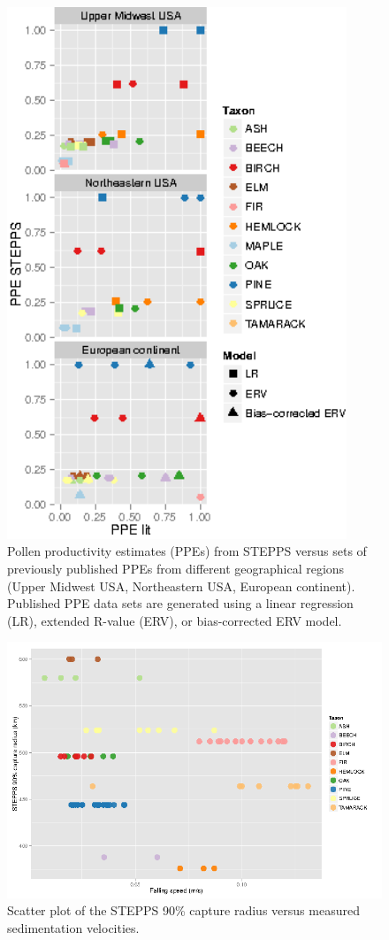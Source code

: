 \begin{figure}
\centering
\includegraphics[width=4in]{figures/PPEs_panels.png}
\caption{Pollen productivity estimates (PPEs) from STEPPS versus sets
  of previously published PPEs from different geographical regions
  (Upper Midwest USA, Northeastern USA, European continent). Published
  PPE data sets are generated using a linear regression (LR), extended
  R-value (ERV), or bias-corrected ERV model.}
\label{fig:ppe}
\end{figure}

\begin{figure}
\centering
\includegraphics[width=7in]{figures/SVs_90_single.png}
\caption{Scatter plot of the STEPPS 90\% capture radius versus
  measured sedimentation velocities.}
\label{fig:svs}
\end{figure}

